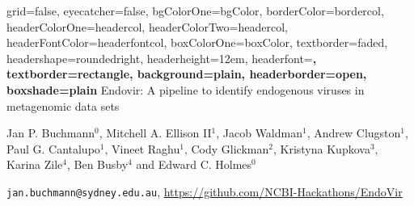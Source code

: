 \documentclass[final, a0paper, portrait]{baposter}
\begin{document}

\background{
}

\begin{poster}{
    grid=false,
    eyecatcher=false,
    bgColorOne=bgColor,
    borderColor=bordercol,
    headerColorOne=headercol,
    headerColorTwo=headercol,
    headerFontColor=headerfontcol,
    boxColorOne=boxColor,
    textborder=faded,
    headershape=roundedright,
    headerheight=12em,
    headerfont=\large\sc\bf,
    textborder=rectangle,
    background=plain,
    headerborder=open,
    boxshade=plain
}
{}
{
   Endovir: A pipeline to identify endogenous viruses in \\metagenomic data sets
}
{
    Jan P. Buchmann$^{0}$, Mitchell A. Ellison II$^{1}$, Jacob Waldman$^{1}$,
    Andrew Clugston$^{1}$, Paul G. Cantalupo$^{1}$, Vineet Raghu$^{1}$,
    Cody Glickman$^{2}$, Kristyna Kupkova$^{3}$, Karina Zile$^{4}$, Ben Busby$^{4}$
    and Edward C. Holmes$^{0}$
    \begin{center}
      {\smaller\texttt{jan.buchmann@sydney.edu.au},
    {\url{https://github.com/NCBI-Hackathons/EndoVir}}}
    \end{center}
}
{}


\end{poster}
\end{document}
